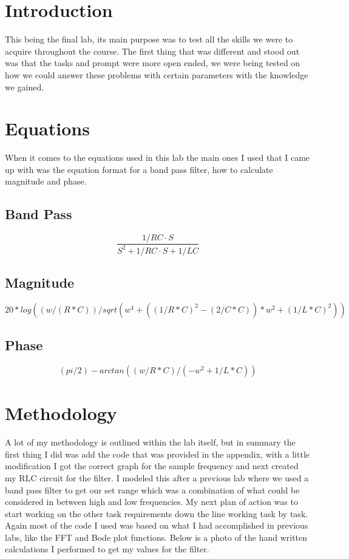 \documentclass[12pt]{report}
\begin{document}
\section{Introduction}
 
This being the final lab, its main purpose was to test all the skills we were to acquire throughout the 
course. The first thing that was different and stood out was that the tasks and prompt were more open ended,
we were being tested on how we could answer these problems with certain parameters with the knowledge we gained. 

\section{Equations}

When it comes to the equations used in this lab the main ones I used that I came up with was the 
equation format for a band pass filter, how to calculate magnitude and phase. 

\subsection{Band Pass}
\begin{equation*}
\frac{1/RC\cdot S}{S^2 + 1/RC\cdot S + 1/LC }
\end{equation*}

\subsection{Magnitude}
\begin{equation*}
20*log((w / (R*C)) / sqrt( w^4 + ((1/R*C)^2 - (2/C*C))*w^2 + (1/L*C)^2))
\end{equation*}

\subsection{Phase}
\begin{equation*}
(pi / 2) - arctan( (w /R*C)/(-w^2 + 1/L*C))
\end{equation*}

\section{Methodology}
A lot of my methodology is outlined within the lab itself, but in summary the first thing I did was add the 
code that was provided in the appendix, with a little modification I got the correct graph for the sample frequency and 
next created my RLC circuit for the filter. I modeled this after a previous lab where we used a band pass filter to get our 
set range which was a combination of what could be considered in between high and low frequencies. My next plan of action was 
to start working on the other task requirements down the line working task by task. Again most of the code I used was based on 
what I had accomplished in previous labs, like the FFT and Bode plot functions. Below is a photo of the hand written calculations I 
performed to get my values for the filter. 
\end{document}
